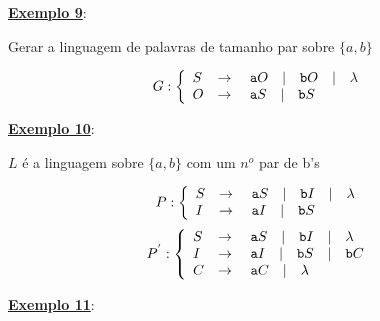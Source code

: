 \vspace{1cm}
\textbf{\underline{Exemplo 9}}:\\

\begin{center}
Gerar a linguagem de palavras de tamanho par sobre $\{a, b\}$\\
  \makebox[\linewidth]{\rule{\paperwidth/2}{0.4pt}}
\end{center}
{\color{blue}
\begin{flushleft}
   \[
      G:\left\{
      \begin{array}{l c l}
        S & \rightarrow & \ \texttt{a}O  \quad | \quad \texttt{b}O\quad | \quad \lambda  \\
        O & \rightarrow & \ \texttt{a}S \quad | \quad \texttt{b}S \\
      \end{array}
      \right.
  \]
\end{flushleft}
}


\vspace{1cm}
\textbf{\underline{Exemplo 10}}:\\

\begin{center}
$L$ é a linguagem sobre $\{a, b\}$ com um $n^{o}$ par de b's\\
  \makebox[\linewidth]{\rule{\paperwidth/2}{0.4pt}}
\end{center}
{\color{blue}
\begin{flushleft}
   \[
      P:\left\{
      \begin{array}{l c l}
        S & \rightarrow & \ \texttt{a}S  \quad | \quad \texttt{b}I\quad | \quad \lambda  \\
        I & \rightarrow & \ \texttt{a}I \quad | \quad \texttt{b}S \\
      \end{array}
      \right.
  \]
     \[
      P^{'}:\left\{
      \begin{array}{l c l}
        S & \rightarrow & \ \texttt{a}S  \quad | \quad \texttt{b}I\quad | \quad \lambda  \\
        I & \rightarrow & \ \texttt{a}I \quad | \quad \texttt{b}S \quad | \quad \texttt{b}C\\
        C & \rightarrow & \ \texttt{a}C \quad | \quad \lambda \\
      \end{array}
      \right.
  \]
\end{flushleft}
}

\vspace{1cm}
\textbf{\underline{Exemplo 11}}:\\

